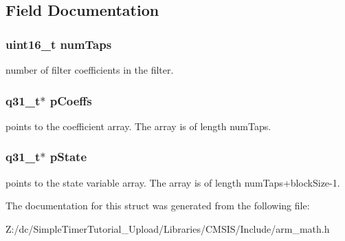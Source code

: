 \subsection{Field Documentation}
\hypertarget{structarm__fir__instance__q31_a751941891e47f522a7f5375fe8990aac}{
\subsubsection[{num\-Taps}]{\setlength{\rightskip}{0pt plus 5cm}uint16\-\_\-t num\-Taps}}\label{structarm__fir__instance__q31_a751941891e47f522a7f5375fe8990aac}
number of filter coefficients in the filter. \hypertarget{structarm__fir__instance__q31_a68888e36167d81cb7836db10367a1682}{
\subsubsection[{p\-Coeffs}]{\setlength{\rightskip}{0pt plus 5cm}q31\-\_\-t$\ast$ p\-Coeffs}}\label{structarm__fir__instance__q31_a68888e36167d81cb7836db10367a1682}
points to the coefficient array. The array is of length num\-Taps. \hypertarget{structarm__fir__instance__q31_adee4ba3ee8869865af7d8fa08ca913d6}{
\subsubsection[{p\-State}]{\setlength{\rightskip}{0pt plus 5cm}q31\-\_\-t$\ast$ p\-State}}\label{structarm__fir__instance__q31_adee4ba3ee8869865af7d8fa08ca913d6}
points to the state variable array. The array is of length num\-Taps+block\-Size-\/1. 

The documentation for this struct was generated from the following file\-:\begin{DoxyCompactItemize}
\item 
Z\-:/dc/\-Simple\-Timer\-Tutorial\-\_\-\-Upload/\-Libraries/\-C\-M\-S\-I\-S/\-Include/arm\-\_\-math.\-h\end{DoxyCompactItemize}
